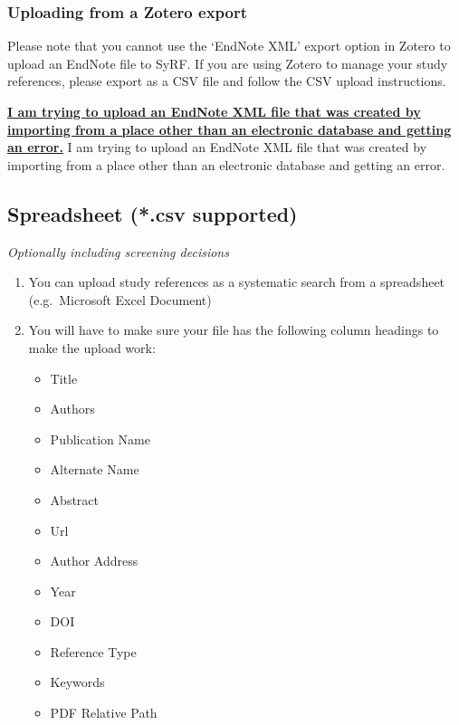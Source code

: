 \documentclass[
]{book}
\providecommand{\tightlist}{%
  \setlength{\itemsep}{0pt}\setlength{\parskip}{0pt}}
\begin{document}
\hypertarget{uploading-from-a-zotero-export}{%
\subsubsection{Uploading from a Zotero export}\label{uploading-from-a-zotero-export}}

Please note that you cannot use the `EndNote XML' export option in Zotero to upload an EndNote file to SyRF. If you are using Zotero to manage your study references, please export as a CSV file and follow the CSV upload instructions.

\href{https://syrf.org.uk/faq}{\textbf{I am trying to upload an EndNote XML file that was created by importing from a place other than an electronic database and getting an error.}}
I am trying to upload an EndNote XML file that was created by importing from a place other than an electronic database and getting an error.

\hypertarget{spreadsheet-.csv-supported}{%
\subsection{Spreadsheet (*.csv supported)}\label{spreadsheet-.csv-supported}}

\emph{Optionally including screening decisions}

\begin{enumerate}
\def\labelenumi{\arabic{enumi}.}
\tightlist
\item
  You can upload study references as a systematic search from a spreadsheet (e.g.~Microsoft Excel Document)\\
\item
  You will have to make sure your file has the following column headings to make the upload work:

  \begin{itemize}
  \tightlist
  \item
    Title
  \item
    Authors
  \item
    Publication Name
  \item
    Alternate Name
  \item
    Abstract
  \item
    Url
  \item
    Author Address
  \item
    Year
  \item
    DOI
  \item
    Reference Type
  \item
    Keywords
  \item
    PDF Relative Path
  \end{itemize}
\end{enumerate}
\end{document}
